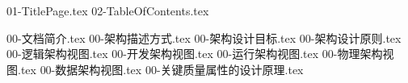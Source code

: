 \documentclass[a4paper,11pt]{book}
\begin{document}
\frontmatter 

{01-TitlePage.tex}
{02-TableOfContents.tex}

\mainmatter


{00-文档简介.tex}
{00-架构描述方式.tex}
{00-架构设计目标.tex}
{00-架构设计原则.tex}
{00-逻辑架构视图.tex}
{00-开发架构视图.tex}
{00-运行架构视图.tex}
{00-物理架构视图.tex}
{00-数据架构视图.tex}
{00-关键质量属性的设计原理.tex}

\backmatter 

\end{document}
